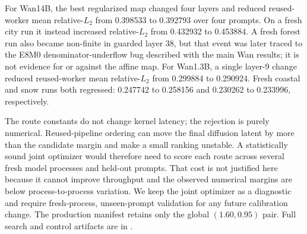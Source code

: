 For Wan14B, the best regularized map changed four layers and reduced reused-
worker mean relative-$L_2$ from 0.398533 to 0.392793 over four prompts. On a
fresh city run it instead increased relative-$L_2$ from 0.432932 to 0.453884.
A fresh forest run also became non-finite in guarded layer 38, but that event
was later traced to the E8M0 denominator-underflow bug described with the main
Wan results; it is not evidence for or against the affine map.
For Wan1.3B, a single layer-9 change reduced reused-worker mean
relative-$L_2$ from 0.299884 to 0.290924. Fresh coastal and snow runs both
regressed: 0.247742 to 0.258156 and 0.230262 to 0.233996, respectively.

The route constants do not change kernel latency; the rejection is purely
numerical. Reused-pipeline ordering can move the final diffusion latent by
more than the candidate margin and make a small ranking unstable. A
statistically sound joint optimizer would therefore need to score each route
across several fresh model processes and held-out prompts. That cost is not
justified here because it cannot improve throughput and the observed numerical
margins are below process-to-process variation. We keep the joint optimizer as
a diagnostic and require fresh-process, unseen-prompt validation for any
future calibration change. The production manifest retains only the global
$(1.60,0.95)$ pair. Full search and control artifacts are in
.
